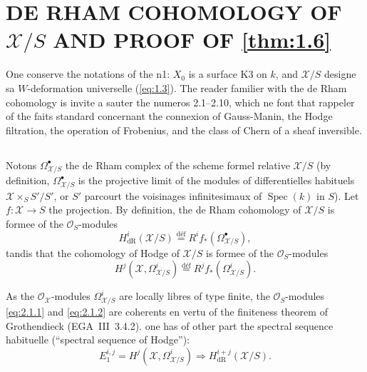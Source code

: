 \documentclass[12pt,a4paper]{article}
\theoremstyle{plain}
\theoremstyle{definition}
\theoremstyle{remark}
\DeclareMathOperator{\Spec}{Spec}
\begin{document}
\section{DE RHAM COHOMOLOGY OF $\mathcal{X}/S$ AND PROOF OF \ref{thm:1.6}}\label{sec:2}

One conserve the notations of the n1: $X_0$ is a surface K3 on $k$, and $\mathcal{X}/S$ designe sa $W$-deformation universelle (\eqref{eq:1.3}). The reader familier with the de Rham cohomology is invite a sauter the numeros 2.1--2.10, which ne font that rappeler of the faits standard concernant the connexion of Gauss-Manin, the Hodge filtration, the operation of Frobenius, and the class of Chern of a sheaf inversible.

\subsection{}

Notons $\Omega_{\mathcal{X}/S}^{\bullet}$ the de Rham complex of the scheme formel relative $\mathcal{X}/S$ (by definition, $\Omega_{\mathcal{X}/S}^{\bullet}$ is the projective limit of the modules of differentielles habituels $\mathcal{X} \times_S S'/S'$, or $S'$ parcourt the voisinages infinitesimaux of $\Spec(k)$ in $S$). Let $f: \mathcal{X} \to S$ the projection. By definition, the de Rham cohomology of $\mathcal{X}/S$ is formee of the $\mathcal{O}_S$-modules
\begin{equation}\label{eq:2.1.1}
H^i_{\mathrm{dR}}(\mathcal{X}/S) \overset{\text{déf}}{=} R^i f_*(\Omega_{\mathcal{X}/S}^{\bullet}),
\end{equation}
tandis that the cohomology of Hodge of $\mathcal{X}/S$ is formee of the $\mathcal{O}_S$-modules
\begin{equation}\label{eq:2.1.2}
H^j(\mathcal{X}, \Omega_{\mathcal{X}/S}^i) \overset{\text{déf}}{=} R^j f_*(\Omega_{\mathcal{X}/S}^i).
\end{equation}

As the $\mathcal{O}_{\mathcal{X}}$-modules $\Omega_{\mathcal{X}/S}^i$ are locally libres of type finite, the $\mathcal{O}_S$-modules \eqref{eq:2.1.1} and \eqref{eq:2.1.2} are coherents en vertu of the finiteness theorem of Grothendieck (EGA~III~3.4.2). one has of other part the spectral sequence habituelle (``spectral sequence of Hodge''):
\begin{equation}\label{eq:2.1.3}
E_1^{i,j} = H^j(\mathcal{X}, \Omega_{\mathcal{X}/S}^i) \Rightarrow H^{i+j}_{\mathrm{dR}}(\mathcal{X}/S).
\end{equation}
\end{document}
